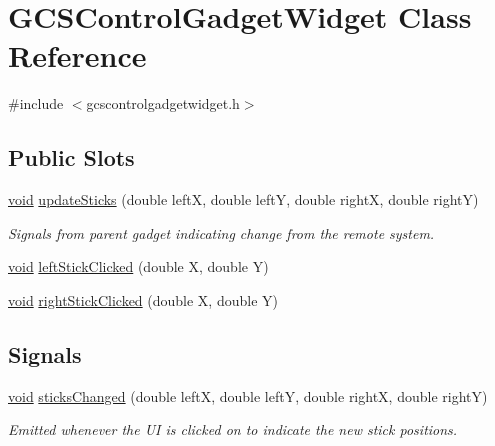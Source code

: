 \hypertarget{class_g_c_s_control_gadget_widget}{\section{\-G\-C\-S\-Control\-Gadget\-Widget \-Class \-Reference}
\label{class_g_c_s_control_gadget_widget}
}


{\ttfamily \#include $<$gcscontrolgadgetwidget.\-h$>$}

\subsection*{\-Public \-Slots}
\begin{DoxyCompactItemize}
\item 
\hyperlink{group___u_a_v_objects_plugin_ga444cf2ff3f0ecbe028adce838d373f5c}{void} \hyperlink{group___g_c_s_control_gadget_plugin_ga279299922ac5990f798325ad238ae58a}{update\-Sticks} (double left\-X, double left\-Y, double right\-X, double right\-Y)
\begin{DoxyCompactList}\small\item\em \-Signals from parent gadget indicating change from the remote system. \end{DoxyCompactList}\item 
\hyperlink{group___u_a_v_objects_plugin_ga444cf2ff3f0ecbe028adce838d373f5c}{void} \hyperlink{group___g_c_s_control_gadget_plugin_ga04d9e7c1a62eff3012500caccbde66d8}{left\-Stick\-Clicked} (double \-X, double \-Y)
\item 
\hyperlink{group___u_a_v_objects_plugin_ga444cf2ff3f0ecbe028adce838d373f5c}{void} \hyperlink{group___g_c_s_control_gadget_plugin_gab69d624dde0231e33d3a5bb6d4d769fa}{right\-Stick\-Clicked} (double \-X, double \-Y)
\end{DoxyCompactItemize}
\subsection*{\-Signals}
\begin{DoxyCompactItemize}
\item 
\hyperlink{group___u_a_v_objects_plugin_ga444cf2ff3f0ecbe028adce838d373f5c}{void} \hyperlink{group___g_c_s_control_gadget_plugin_gacad03ad4b99da2390b6a712a475b4987}{sticks\-Changed} (double left\-X, double left\-Y, double right\-X, double right\-Y)
\begin{DoxyCompactList}\small\item\em \-Emitted whenever the \-U\-I is clicked on to indicate the new stick positions. \end{DoxyCompactList}\end{DoxyCompactItemize}
